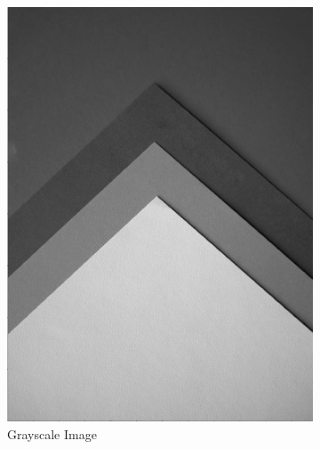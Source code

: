 \documentclass[landscape,a0paper,fontscale=0.5]{baposter} %
\begin{document}
\begin{poster}
{\begin{figure}[H]
\begin{subfigure}{0.2\textwidth}
		\includegraphics[scale=0.115]{2Pattern.jpg}
		\caption{Grayscale Image} %
	\end{subfigure}
	\begin{subfigure}{0.2\textwidth} %

\end{subfigure}
\end{figure}}
\end{poster}
\end{document}
